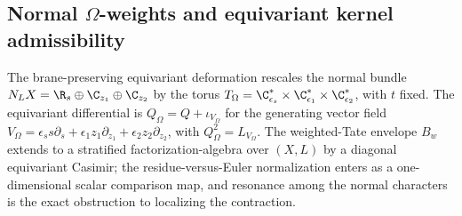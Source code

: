 \subsection*{Normal \(\Omega\)-weights and equivariant kernel admissibility}

The brane-preserving equivariant deformation rescales the normal bundle
\(N_LX=\R_s\oplus\C_{z_1}\oplus\C_{z_2}\) by the torus
\(T_\Omega=\C^*_{\epsilon_s}\times\C^*_{\epsilon_1}\times\C^*_{\epsilon_2}\),
with \(t\) fixed.  The equivariant differential is
\(Q_\Omega=Q+\iota_{V_\Omega}\) for the generating vector field
\(V_\Omega=\epsilon_s s\partial_s+\epsilon_1z_1\partial_{z_1}+\epsilon_2z_2\partial_{z_2}\),
with \(Q_\Omega^2=L_{V_\Omega}\).  The weighted-Tate envelope $B_w$
extends to a stratified factorization-algebra over \((X,L)\) by a
diagonal equivariant Casimir; the residue-versus-Euler normalization
enters as a one-dimensional scalar comparison map, and resonance among
the normal characters is the exact obstruction to localizing the
contraction.

